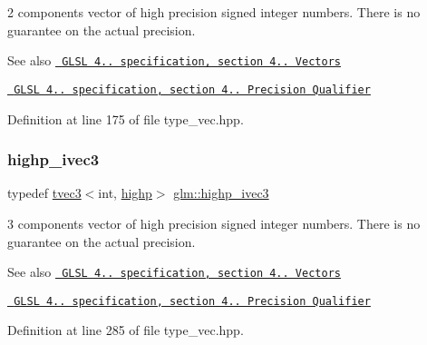 2 components vector of high precision signed integer numbers. There is no guarantee on the actual precision.

\begin{DoxySeeAlso}{See also}
\href{http://www.opengl.org/registry/doc/GLSLangSpec.4.20.8.pdf}{\texttt{ G\+L\+SL 4.. specification, section 4.. Vectors}} 

\href{http://www.opengl.org/registry/doc/GLSLangSpec.4.20.8.pdf}{\texttt{ G\+L\+SL 4.. specification, section 4.. Precision Qualifier}} 
\end{DoxySeeAlso}


Definition at line 175 of file type\+\_\+vec.\+hpp.

\mbox{\label{group__core__precision_gaef51de6bc442bfce2602dc301708720a}} 
\subsubsection{\texorpdfstring{highp\_ivec3}{highp\_ivec3}}
{\footnotesize\ttfamily typedef \mbox{\hyperlink{structglm_1_1tvec3}{tvec3}}$<$int, \mbox{\hyperlink{namespaceglm_a0f04f086094c747d227af4425893f545ac6f7eab42eacbb10d59a58e95e362074}{highp}}$>$ \mbox{\hyperlink{group__core__precision_gaef51de6bc442bfce2602dc301708720a}{glm\+::highp\+\_\+ivec3}}}

3 components vector of high precision signed integer numbers. There is no guarantee on the actual precision.

\begin{DoxySeeAlso}{See also}
\href{http://www.opengl.org/registry/doc/GLSLangSpec.4.20.8.pdf}{\texttt{ G\+L\+SL 4.. specification, section 4.. Vectors}} 

\href{http://www.opengl.org/registry/doc/GLSLangSpec.4.20.8.pdf}{\texttt{ G\+L\+SL 4.. specification, section 4.. Precision Qualifier}} 
\end{DoxySeeAlso}


Definition at line 285 of file type\+\_\+vec.\+hpp.

\mbox{\label{group__core__precision_ga9303c2a9e1f1e761961eeecbcda2d34f}} 
